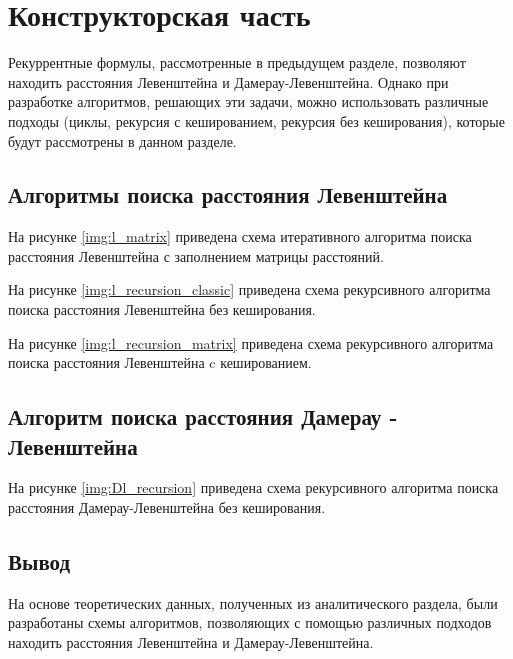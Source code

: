 \chapter{Конструкторская часть}

Рекуррентные формулы, рассмотренные в предыдущем разделе, позволяют находить расстояния Левенштейна и Дамерау-Левенштейна. Однако при разработке алгоритмов, решающих эти задачи, можно использовать различные подходы (циклы, рекурсия с кешированием, рекурсия без кеширования), которые будут рассмотрены в данном разделе.

\section{Алгоритмы поиска расстояния Левенштейна}

На рисунке \ref{img:l_matrix} приведена схема итеративного алгоритма поиска расстояния Левенштейна с заполнением матрицы расстояний.


На рисунке \ref{img:l_recursion_classic} приведена схема рекурсивного алгоритма поиска расстояния Левенштейна без кеширования.


На рисунке \ref{img:l_recursion_matrix} приведена схема рекурсивного алгоритма поиска расстояния Левенштейна c кешированием.


\section{Алгоритм поиска расстояния Дамерау - Левенштейна}

На рисунке \ref{img:Dl_recursion} приведена схема рекурсивного алгоритма поиска расстояния Дамерау-Левенштейна без кеширования.




\section*{Вывод}

На основе теоретических данных, полученных из аналитического раздела, были разработаны схемы алгоритмов, позволяющих с помощью различных подходов находить расстояния Левенштейна и Дамерау-Левенштейна.


